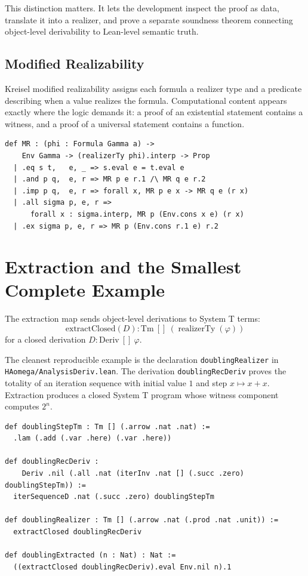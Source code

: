 \documentclass[11pt,a4paper]{article}
\theoremstyle{definition}
\theoremstyle{remark}
\newcommand{\Deriv}{\ensuremath{\mathrm{Deriv}}}
\newcommand{\Tm}{\ensuremath{\mathrm{Tm}}}
\newcommand{\extractClosed}{\ensuremath{\mathrm{extractClosed}}}
\newcommand{\lean}[1]{\texttt{\nolinkurl{#1}}}
\begin{document}
This distinction matters.  It lets the development inspect the proof as data,
translate it into a realizer, and prove a separate soundness theorem connecting
object-level derivability to Lean-level semantic truth.

\subsection{Modified Realizability}

Kreisel modified realizability assigns each formula a realizer type and a
predicate describing when a value realizes the formula.  Computational content
appears exactly where the logic demands it: a proof of an existential statement
contains a witness, and a proof of a universal statement contains a function.

\begin{lstlisting}[language=Lean]
def MR : (phi : Formula Gamma a) ->
    Env Gamma -> (realizerTy phi).interp -> Prop
  | .eq s t,   e, _ => s.eval e = t.eval e
  | .and p q,  e, r => MR p e r.1 /\ MR q e r.2
  | .imp p q,  e, r => forall x, MR p e x -> MR q e (r x)
  | .all sigma p, e, r =>
      forall x : sigma.interp, MR p (Env.cons x e) (r x)
  | .ex sigma p, e, r => MR p (Env.cons r.1 e) r.2
\end{lstlisting}

\section{Extraction and the Smallest Complete Example}

The extraction map sends object-level derivations to System T terms:
\[
  \extractClosed(D) : \Tm\ []\ (\operatorname{realizerTy}(\varphi))
\]
for a closed derivation \(D : \Deriv\ []\ \varphi\).

The cleanest reproducible example is the declaration
\lean{doublingRealizer} in \lean{HAomega/AnalysisDeriv.lean}.  The derivation
\lean{doublingRecDeriv} proves the totality of an iteration sequence with
initial value \(1\) and step \(x\mapsto x+x\).  Extraction produces a closed
System T program whose witness component computes \(2^n\).

\begin{lstlisting}[language=Lean]
def doublingStepTm : Tm [] (.arrow .nat .nat) :=
  .lam (.add (.var .here) (.var .here))

def doublingRecDeriv :
    Deriv .nil (.all .nat (iterInv .nat [] (.succ .zero) doublingStepTm)) :=
  iterSequenceD .nat (.succ .zero) doublingStepTm

def doublingRealizer : Tm [] (.arrow .nat (.prod .nat .unit)) :=
  extractClosed doublingRecDeriv

def doublingExtracted (n : Nat) : Nat :=
  ((extractClosed doublingRecDeriv).eval Env.nil n).1
\end{lstlisting}
\end{document}
